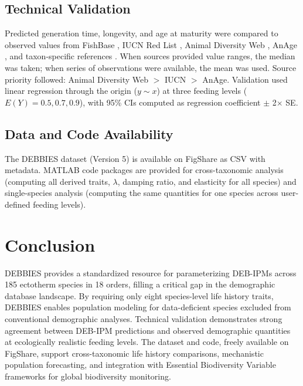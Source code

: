 \documentclass[11pt]{article}
\begin{document}
\subsection{Technical Validation}

Predicted generation time, longevity, and age at maturity were compared to observed values from FishBase \citep{froese2023fishbase}, IUCN Red List \citep{iucn2023red}, Animal Diversity Web \citep{myer2000animal}, AnAge \citep{tacutu2018human}, and taxon-specific references \citep{ebert2021sharks, last2016rays}. When sources provided value ranges, the median was taken; when series of observations were available, the mean was used. Source priority followed: Animal Diversity Web $>$ IUCN $>$ AnAge. Validation used linear regression through the origin ($y \sim x$) at three feeding levels ($E(Y) = 0.5, 0.7, 0.9$), with 95\% CIs computed as regression coefficient $\pm$ 2$\times$ SE.

\subsection{Data and Code Availability}

The DEBBIES dataset (Version 5) is available on FigShare as CSV with metadata. MATLAB code packages are provided for cross-taxonomic analysis (computing all derived traits, $\lambda$, damping ratio, and elasticity for all species) and single-species analysis (computing the same quantities for one species across user-defined feeding levels).

\section{Conclusion}

DEBBIES provides a standardized resource for parameterizing DEB-IPMs across 185 ectotherm species in 18 orders, filling a critical gap in the demographic database landscape. By requiring only eight species-level life history traits, DEBBIES enables population modeling for data-deficient species excluded from conventional demographic analyses. Technical validation demonstrates strong agreement between DEB-IPM predictions and observed demographic quantities at ecologically realistic feeding levels. The dataset and code, freely available on FigShare, support cross-taxonomic life history comparisons, mechanistic population forecasting, and integration with Essential Biodiversity Variable frameworks for global biodiversity monitoring.



\end{document}
